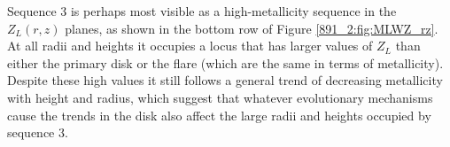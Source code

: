 
Sequence 3 is perhaps most visible as a high-metallicity sequence in
the $Z_L(r,z)$ planes, as shown in the bottom row of Figure
\ref{891_2:fig:MLWZ_rz}. At all radii and heights it occupies a locus that
has larger values of $Z_L$ than either the primary disk or the flare
(which are the same in terms of metallicity). Despite these high
values it still follows a general trend of decreasing metallicity with
height and radius, which suggest that whatever evolutionary mechanisms
cause the trends in the disk also affect the large radii and heights
occupied by sequence 3.





